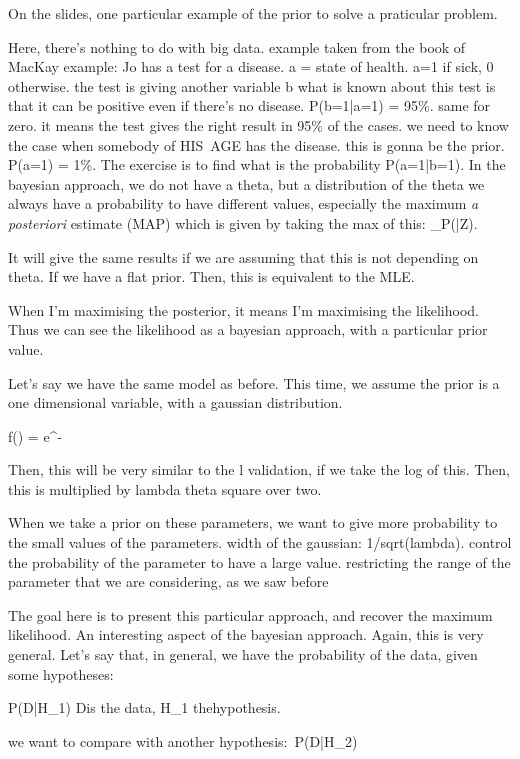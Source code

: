 \documentclass[a4paper]{tufte-book}
\begin{document}
On the slides, one particular example of the prior to solve a praticular problem.


Here, there's nothing to do with big data. example taken from the book of MacKay
example: Jo has a test for a disease. a = state of health.
a=1 if sick, 0 otherwise.
the test is giving another variable b
what is known about this test is that it can be positive even if there's no
disease. P(b=1|a=1) = 95\%. same for zero.
it means the test gives the right result in 95\% of the cases.
we need to know the case when somebody of HIS AGE has the disease. this
is gonna be the prior. P(a=1) = 1\%.
The exercise is to find what is the probability P(a=1|b=1).
In the bayesian approach, we do not have a theta, but a distribution of the theta
we always have a probability to have different values, especially the maximum
\emph{a posteriori} estimate (MAP)
which is given by taking the max of this:
\max_\theta P(\theta|Z).

It will give the same results if we are assuming that this is not depending on theta. If we have a flat prior.
Then, this is equivalent to the MLE.

When I'm maximising the posterior, it means I'm maximising the likelihood.
Thus we can see the likelihood as a bayesian approach, with a particular prior
value.

Let's say we have the same model as before. This time, we assume the prior is
a one dimensional variable, with a gaussian distribution.

f(\theta)  = \sqrt{\frac{\lambda}{2\pi}} e^{-\lambda {}}

Then, this will be very similar to the l validation, if we take the log of this.
Then, this is multiplied by lambda theta square over two.

When we take a prior on these parameters, we want to give more probability to
the small values of the parameters. width of the gaussian: 1/sqrt(lambda).
control the probability of the parameter to have a large value.
restricting the range of the parameter that we are considering, as we saw before

The goal here is to present this particular approach, and recover the maximum
likelihood.
An interesting aspect of the bayesian approach. Again, this is very general.
Let's say that, in general, we have the probability of the data, given some
hypotheses:

P(D|H_1)
Dis the data, H_1 thehypothesis.

we want to compare with another hypothesis: P(D|H_2)
\end{document}
